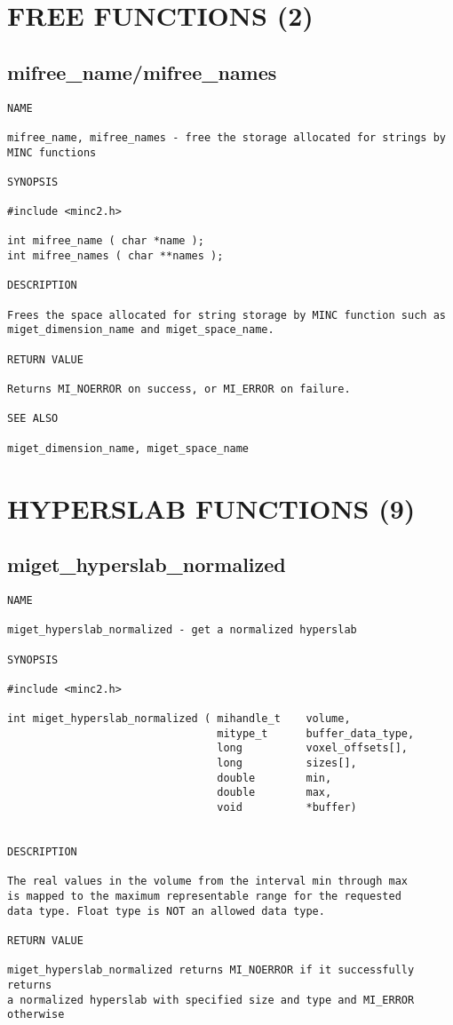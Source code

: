\documentclass{article}
\begin{document}
\section{FREE FUNCTIONS (2)}
\subsection{mifree\_name/mifree\_names}
\begin{verbatim}
NAME

mifree_name, mifree_names - free the storage allocated for strings by 
MINC functions

SYNOPSIS

#include <minc2.h>

int mifree_name ( char *name );
int mifree_names ( char **names );

DESCRIPTION

Frees the space allocated for string storage by MINC function such as
miget_dimension_name and miget_space_name.

RETURN VALUE

Returns MI_NOERROR on success, or MI_ERROR on failure.

SEE ALSO

miget_dimension_name, miget_space_name
\end{verbatim}

\section{HYPERSLAB FUNCTIONS (9)}
\subsection{miget\_hyperslab\_normalized}
\begin{verbatim}
NAME

miget_hyperslab_normalized - get a normalized hyperslab

SYNOPSIS

#include <minc2.h>

int miget_hyperslab_normalized ( mihandle_t    volume,
                                 mitype_t      buffer_data_type,
                                 long          voxel_offsets[],
                                 long          sizes[],
                                 double        min,
                                 double        max,
                                 void          *buffer)
                                  
                                
DESCRIPTION

The real values in the volume from the interval min through max
is mapped to the maximum representable range for the requested
data type. Float type is NOT an allowed data type.

RETURN VALUE

miget_hyperslab_normalized returns MI_NOERROR if it successfully returns
a normalized hyperslab with specified size and type and MI_ERROR otherwise
\end{verbatim}
\end{document}
